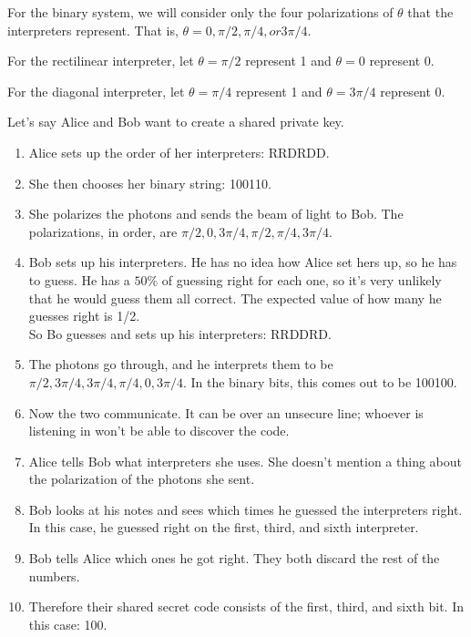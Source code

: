 \item For the binary system, we will consider only the four polarizations of $\theta$ that the interpreters represent. That is, $\theta = 0, \pi/2, \pi/4, or 3\pi/4$.
\item For the rectilinear interpreter, let $\theta=\pi/2$ represent 1 and $\theta=0$ represent 0.
\item For the diagonal interpreter, let $\theta=\pi/4$ represent 1 and $\theta=3\pi/4$ represent 0.
\begin{example}
\item Let's say Alice and Bob want to create a shared private key.
\begin{enumerate}
\item Alice sets up the order of her interpreters: RRDRDD.
\item She then chooses her binary string: 100110.
\item She polarizes the photons and sends the beam of light to Bob. The polarizations, in order, are $\pi/2, 0, 3\pi/4, \pi/2, \pi/4, 3\pi/4$.

\item Bob sets up his interpreters. He has no idea how Alice set hers up, so he has to guess. He has a $50\%$ of guessing right for each one, so it's very unlikely that he would guess them all correct. The expected value of how many he guesses right is 1/2.
\\ So Bo guesses and sets up his interpreters: RRDDRD.
\item The photons go through, and he interprets them to be $\pi/2, 3\pi/4, 3\pi/4, \pi/4, 0, 3\pi/4$.
In the binary bits, this comes out to be 100100.

\item Now the two communicate. It can be over an unsecure line; whoever is listening in won't be able to discover the code.
\item Alice tells Bob what interpreters she uses. She doesn't mention a thing about the polarization of the photons she sent.
\item Bob looks at his notes and sees which times he guessed the interpreters right. In this case, he guessed right on the first, third, and sixth interpreter.
\item Bob tells Alice which ones he got right. They both discard the rest of the numbers.
\item Therefore their shared secret code consists of the first, third, and sixth bit. In this case: 100.
\end{enumerate}
\end{example}
